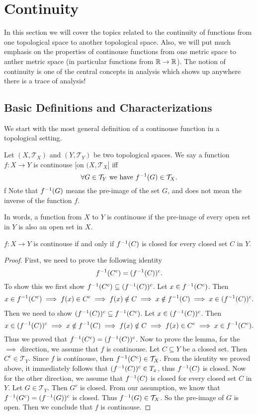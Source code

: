 \chapter{Continuity}
In this section we will cover the topics related to the continuity of functions from one topological space to another topological space. Also, we will put much emphasis on the properties of continouse functions from one metric space to anther metric space (in particular functions from $\mathbb{R} \to \mathbb{R}$). The notion of continuity is one of the central concepts in analysis which shows up anywhere there is a trace of analysis!

\section{Basic Definitions and Characterizations}
We start with the most general definition of a continouse function in a topological setting.

\begin{definition}
	Let $(X,\mathcal{T}_X)$ and $(Y,\mathcal{T}_Y)$ be two topological spaces. We say a function $f: X \to Y$ is continouse [on $(X,\mathcal{T}_X$] iff
	\[ \forall G \in \mathcal{T}_Y \ \text{we have}\  f^{-1}(G) \in \mathcal{T}_X. \]f
	Note that $f^{-1}(G)$ means the pre-image of the set $G$, and does not mean the inverse of the function $f$.
\end{definition}
In words, a function from $X$ to $Y$ is continouse if the pre-image of every open set in $Y$ is also an open set in $X$. 

\begin{lemma}
	$f: X \to Y$ is continouse if and only if $f^{-1}(C)$ is closed for every closed set $C$ in $Y$.
\end{lemma}

\begin{proof}
	First, we need to prove the following identity
	\[ f^{-1}(C^c) = (f^{-1}(C))^c. \]
	To show this we first show $f^{-1}(C^c) \subseteq (f^{-1}(C))^c$. Let $x \in f^{-1}(C^c)$. Then
	\begin{align*}
		x \in f^{-1}(C^c) \implies f(x) \in C^c \implies f(x) \notin C \implies x \notin f^{-1}(C) \implies x \in (f^{-1}(C))^c.
	\end{align*}
	Then we need to show $ (f^{-1}(C))^c \subseteq f^{-1}(C^c) $. Let $x\in(f^{-1}(C))^c$. Then 
	\[ x\in(f^{-1}(C))^c \implies x \notin f^{-1}(C) \implies f(x)\notin C \implies f(x) \in C^c \implies x \in f^{-1}(C^c). \]
	Thus we proved that $f^{-1}(C^c) = (f^{-1}(C))^c$. Now to prove the lemma, for the $\implies$ direction, we assume that $f$ is continouse. Let $C \subseteq Y$ be a closed set. Then $C^c \in \mathcal{T}_Y$. Since $f$ is continouse, then $f^{-1}(C^c) \in \mathcal{T}_X$. From the identity we proved above, it immediately follows that $(f^{-1}(C))^c \in T_x$, thus $f^{-1}(C)$ is closed.  Now for the other direction, we assume that $f^{-1}(C)$ is closed for every closed set $C$ in $Y$. Let $G \in \mathcal{T}_Y$. Then $G^c$ is closed. From our assumption, we know that $f^{-1}(G^c) = (f^{-1}(G))^c$ is closed. Thus $f^{-1}(G) \in \mathcal{T}_X$. So the pre-image of $G$ is open. Then we conclude that $f$ is continouse.
\end{proof}

